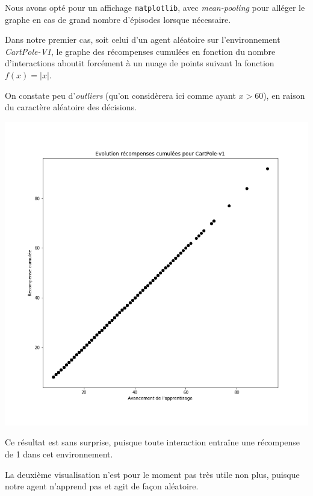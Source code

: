 \documentclass[12pt,french]{article}
\begin{document}
Nous avons opté pour un affichage \texttt{matplotlib}, avec \textit{mean-pooling} pour alléger le graphe en cas de grand nombre d'épisodes lorsque nécessaire.

Dans notre premier cas, soit celui d'un agent aléatoire sur l'environnement \textit{CartPole-V1}, le graphe des récompenses cumulées en fonction du nombre d'interactions aboutit forcément à un nuage de points suivant la fonction $f(x) = |x|$.

On constate peu d'\textit{outliers} (qu'on considèrera ici comme ayant $x > 60$), en raison du caractère aléatoire des décisions.

\begin{center}
    \includegraphics[width=\textwidth]{../src/img/env_CartPole-v1_random_cumu.png}
\end{center}

Ce résultat est sans surprise, puisque toute interaction entraîne une récompense de 1 dans cet environnement.

La deuxième visualisation n'est pour le moment pas très utile non plus, puisque notre agent n'apprend pas et agit de façon aléatoire.
\end{document}

